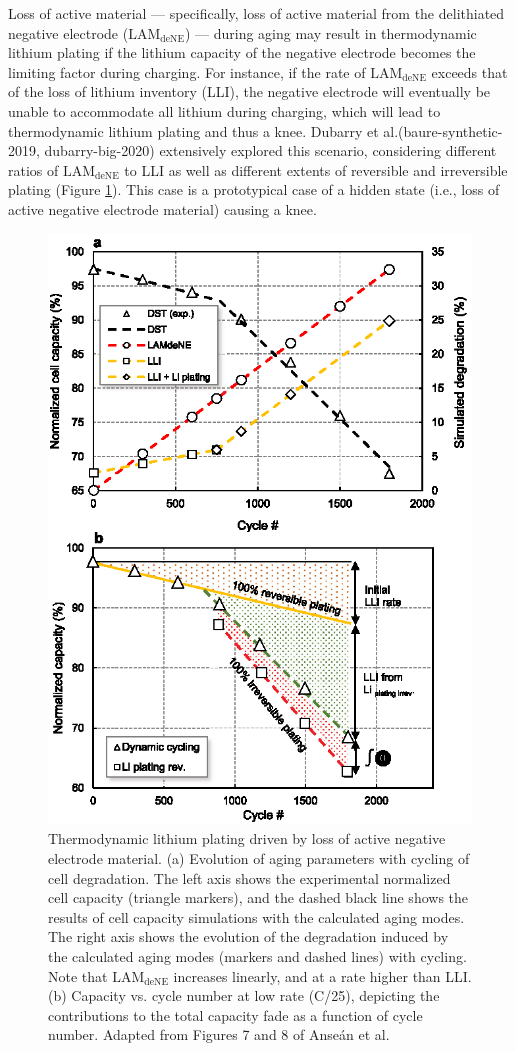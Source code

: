 \documentclass[journal=jpcl, manuscript=article, layout=onecolumn]{achemso}
\begin{document}
Loss of active material --- specifically, loss of active material from the delithiated negative electrode ($\mathrm{LAM_{deNE}}$) --- during aging may result in thermodynamic lithium plating if the lithium capacity of the negative electrode becomes the limiting factor during charging. For instance, if the rate of $\mathrm{LAM_{deNE}}$ exceeds that of the loss of lithium inventory (LLI), the negative electrode will eventually be unable to accommodate all lithium during charging, which will lead to thermodynamic lithium plating and thus a knee. Dubarry et al.\cite{ansean_operando_2017, dubarry_durability_2018}(baure-synthetic-2019, dubarry-big-2020) extensively explored this scenario, considering different ratios of $\mathrm{LAM_{deNE}}$ to LLI as well as different extents of reversible and irreversible plating (Figure \ref{fig:thermo_plating}). This case is a prototypical case of a hidden state (i.e., loss of active negative electrode material) causing a knee.

\begin{figure}[ht]
    \centering
    \includegraphics[width=0.7\linewidth]{figures/thermo_plating_dubarry.eps}
    \caption{Thermodynamic lithium plating driven by loss of active negative electrode material. (a) Evolution of aging parameters with cycling of cell degradation. The left axis shows the experimental normalized cell capacity (triangle markers), and the dashed black line shows the results of cell capacity simulations with the calculated aging modes. The right axis shows the evolution of the degradation induced by the calculated aging modes (markers and dashed lines) with cycling. Note that $\mathrm{LAM_{deNE}}$ increases linearly, and at a rate higher than LLI.
    (b) Capacity vs. cycle number at low rate (C/25), depicting the contributions to the total capacity fade as a function of cycle number.
    Adapted from Figures 7 and 8 of Anse\'an et al.\cite{ansean_operando_2017}}
    \label{fig:thermo_plating}
\end{figure}
\end{document}
